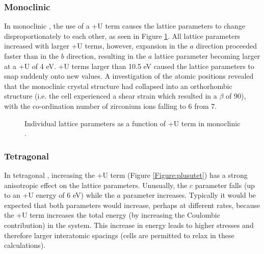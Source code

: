 \subsubsection{Monoclinic}

In monoclinic \zirconia , the use of a +U term causes the lattice parameters to change disproportionately to each other, as seen in Figure \ref{Figure:plusumono}. All lattice parameters increased with larger +U terms, however, expansion in the $a$ direction proceeded faster than in the $b$ direction, resulting in the $a$ lattice parameter becoming larger at a +U of 4 eV. +U terms larger than 10.5 eV caused the lattice parameters to snap suddenly onto new values. A  investigation of the atomic positions revealed that the monoclinic crystal structure had collapsed into an orthorhombic structure (i.e. the cell experienced a shear strain which resulted in a $\beta$ of 90\textdegree), with the co-ordination number of zirconium ions falling to 6 from 7.

\begin{figure}[ht] %
\begin{center}
		\caption{Individual lattice parameters as a function of +U term in monoclinic \zirconia .}
		\label{Figure:plusumono}
	\end{center}
\end{figure}

\subsubsection{Tetragonal}

In tetragonal \zirconia , increasing the +U term (Figure \ref{Figure:plusutet}) has a strong anisotropic effect on the lattice parameters. Unusually, the $c$ parameter falls (up to an +U energy of 6 eV) while the $a$ parameter increases. Typically it would be expected that both parameters would increase, perhaps at different rates, because the +U term increases the total energy (by increasing the Coulombic contribution) in the system. This increase in energy leads to higher stresses and therefore larger interatomic spacings (cells are permitted to relax in these calculations).

